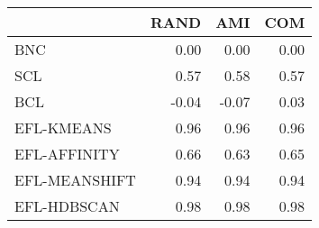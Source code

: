 \begin{tabular}{lrrr}
\toprule
 & RAND & AMI & COM \\
\midrule
BNC & 0.00 & 0.00 & 0.00 \\
SCL & 0.57 & 0.58 & 0.57 \\
BCL & -0.04 & -0.07 & 0.03 \\
EFL-KMEANS & 0.96 & 0.96 & 0.96 \\
EFL-AFFINITY & 0.66 & 0.63 & 0.65 \\
EFL-MEANSHIFT & 0.94 & 0.94 & 0.94 \\
EFL-HDBSCAN & 0.98 & 0.98 & 0.98 \\
\bottomrule
\end{tabular}
